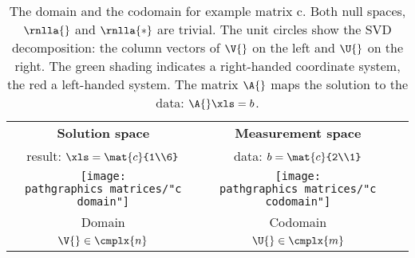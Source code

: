 \begin{table}[t]
	\begin{center}
		\begin{tabular}{ccc}
		  \textbf{Solution space} & \textbf{Measurement space} \\
		  result: $\xls = \mat{c}{1\\6}$ & data: $b = \mat{c}{2\\1}$\\[15pt]
		  \texttt{[image: \\pathgraphics matrices/"c domain"]} & \qquad
		  \texttt{[image: \\pathgraphics matrices/"c codomain"]} \\
		  Domain & Codomain \\[5pt]
		  $\V{} \in \cmplx{n}$ & $\U{} \in \cmplx{m}$ \\[10pt]
		\end{tabular}
	\end{center}
	\caption{The domain and the codomain for example matrix c. Both null spaces, $\rnlla{}$ and $\rnlla{*}$ are trivial. The unit circles show the SVD decomposition: the column vectors of $\V{}$ on the left and $\U{}$ on the right. The green shading indicates a right-handed coordinate system, the red a left-handed system. The matrix $\A{}$ maps the solution to the data: $\A{}\xls=b$.}
\end{table}%

\endinput  %

